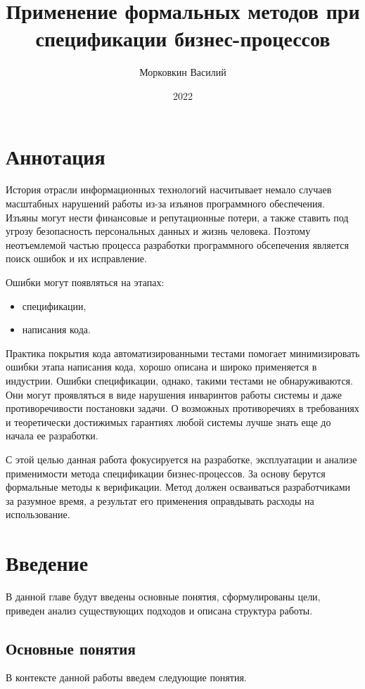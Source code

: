 \documentclass[14pt, openany]{book}
\title{Применение формальных методов при спецификации бизнес-процессов}
\author{Морковкин Василий}
\date{2022}
\begin{document}
\maketitle
\chapter*{Аннотация}
\par
История отрасли информационных технологий насчитывает немало случаев масштабных нарушений работы из-за изъянов программного обеспечения. Изъяны могут нести финансовые и репутационные потери, а также ставить под угрозу безопасность персональных данных и жизнь человека. Поэтому неотъемлемой частью процесса разработки программного обсепечения является поиск ошибок и их исправление.

Ошибки могут появляться на этапах:
\begin{itemize}
  \item спецификации,
  \item написания кода.
\end{itemize}

Практика покрытия кода автоматизированными тестами помогает минимизировать ошибки этапа написания кода, хорошо описана и широко применяется в индустрии. Ошибки спецификации, однако, такими тестами не обнаруживаются. Они могут проявляться в виде нарушения инваринтов работы системы и даже противоречивости постановки задачи. О возможных противоречиях в требованиях и теоретически достижимых гарантиях любой системы лучше знать еще до начала ее разработки. 

С этой целью данная работа фокусируется на разработке, эксплуатации и анализе применимости метода спецификации бизнес-процессов. За основу берутся формальные методы к верификации. Метод должен осваиваться разработчиками за разумное время, а результат его применения оправдывать расходы на использование.


\setcounter{page}{1}
\tableofcontents
\clearpage



\chapter{Введение}
В данной главе будут введены основные понятия, сформулированы цели, приведен анализ существующих подходов и описана структура работы.

\section{Основные понятия}
В контексте данной работы введем следующие понятия.
\end{document}
